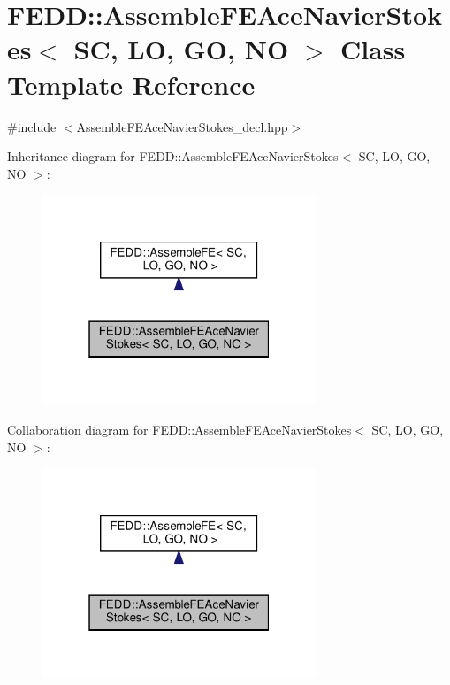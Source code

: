\hypertarget{classFEDD_1_1AssembleFEAceNavierStokes}{}\section{F\+E\+DD\+:\+:Assemble\+F\+E\+Ace\+Navier\+Stokes$<$ SC, LO, GO, NO $>$ Class Template Reference}
\label{classFEDD_1_1AssembleFEAceNavierStokes}


{\ttfamily \#include $<$Assemble\+F\+E\+Ace\+Navier\+Stokes\+\_\+decl.\+hpp$>$}



Inheritance diagram for F\+E\+DD\+:\+:Assemble\+F\+E\+Ace\+Navier\+Stokes$<$ SC, LO, GO, NO $>$\+:
\nopagebreak
\begin{figure}[H]
\begin{center}
\leavevmode
\includegraphics[width=232pt]{classFEDD_1_1AssembleFEAceNavierStokes__inherit__graph}
\end{center}
\end{figure}


Collaboration diagram for F\+E\+DD\+:\+:Assemble\+F\+E\+Ace\+Navier\+Stokes$<$ SC, LO, GO, NO $>$\+:
\nopagebreak
\begin{figure}[H]
\begin{center}
\leavevmode
\includegraphics[width=232pt]{classFEDD_1_1AssembleFEAceNavierStokes__coll__graph}
\end{center}
\end{figure}
